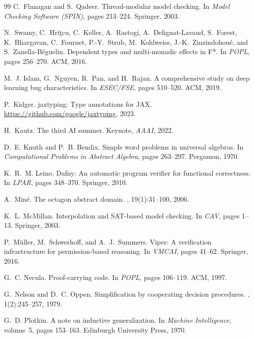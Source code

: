 \documentclass[11pt]{article}
\begin{document}
\begin{thebibliography}{99}
C.~Flanagan and S.~Qadeer.
\newblock Thread-modular model checking.
\newblock In {\em Model Checking Software (SPIN)}, pages 213--224. Springer, 2003.

N.~Swamy, C.~Hri\c{t}cu, C.~Keller, A.~Rastogi, A.~Delignat-Lavaud,
  S.~Forest, K.~Bhargavan, C.~Fournet, P.-Y.~Strub, M.~Kohlweiss,
  J.-K.~Zinzindohou\'{e}, and S.~Zanella-B\'{e}guelin.
\newblock Dependent types and multi-monadic effects in {F*}.
\newblock In {\em POPL}, pages 256--270. ACM, 2016.

M.~J. Islam, G.~Nguyen, R.~Pan, and H.~Rajan.
\newblock A comprehensive study on deep learning bug characteristics.
\newblock In {\em ESEC/FSE}, pages 510--520. ACM, 2019.

P.~Kidger.
\newblock jaxtyping: Type annotations for {JAX}.
\newblock \url{https://github.com/google/jaxtyping}, 2023.

H.~Kautz.
\newblock The third {AI} summer.
\newblock Keynote, {\em AAAI}, 2022.

D.~E. Knuth and P.~B. Bendix.
\newblock Simple word problems in universal algebras.
\newblock In {\em Computational Problems in Abstract Algebra},
  pages 263--297. Pergamon, 1970.

K.~R.~M. Leino.
\newblock Dafny: An automatic program verifier for functional correctness.
\newblock In {\em LPAR}, pages 348--370. Springer, 2010.

A.~Min\'{e}.
\newblock The octagon abstract domain.
, 19(1):31--100, 2006.

K.~L. McMillan.
\newblock Interpolation and {SAT}-based model checking.
\newblock In {\em CAV}, pages 1--13. Springer, 2003.

P.~M\"{u}ller, M.~Schwerhoff, and A.~J.~Summers.
\newblock Viper: A verification infrastructure for permission-based reasoning.
\newblock In {\em VMCAI}, pages 41--62. Springer, 2016.

G.~C. Necula.
\newblock Proof-carrying code.
\newblock In {\em POPL}, pages 106--119. ACM, 1997.

G.~Nelson and D.~C. Oppen.
\newblock Simplification by cooperating decision procedures.
, 1(2):245--257, 1979.

G.~D. Plotkin.
\newblock A note on inductive generalization.
\newblock In {\em Machine Intelligence}, volume~5, pages 153--163.
  Edinburgh University Press, 1970.


\end{thebibliography}
\end{document}
